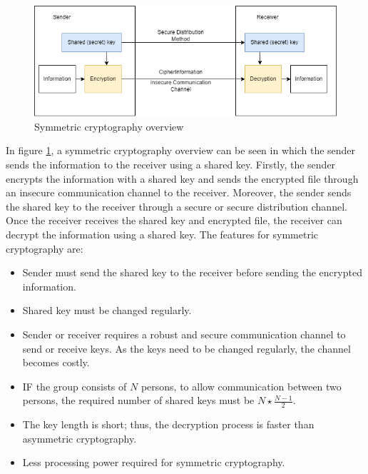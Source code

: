 \documentclass[12pt,a4paper]{article}
\begin{document}
\begin{figure}[H]
\centering
\includegraphics[scale=0.65]{symmetric_cryptography.PNG}
\caption{Symmetric cryptography overview \cite{r23}}
\label{symmetric_cryptography}
\end{figure}

In figure \ref{symmetric_cryptography}, a symmetric cryptography overview can be seen in which the sender sends the information to the receiver using a shared key. Firstly, the sender encrypts the information with a shared key and sends the encrypted file through an insecure communication channel to the receiver. Moreover, the sender sends the shared key to the receiver through a secure or secure distribution channel. Once the receiver receives the shared key and encrypted file, the receiver can decrypt the information using a shared key. The features for symmetric cryptography are: \cite{r23}

\begin{itemize}

\item Sender must send the shared key to the receiver before sending the encrypted information. \cite{r23}

\item Shared key must be changed regularly. \cite{r23}

\item Sender or receiver requires a robust and secure communication channel to send or receive keys. As the keys need to be changed regularly, the channel becomes costly. \cite{r23}

\item IF the group consists of $N$ persons, to allow communication between two persons, the required number of shared keys must be $N \star \frac{N-1}{2}$. \cite{r23}

\item The key length is short; thus, the decryption process is faster than asymmetric cryptography. \cite{r23}

\item Less processing power required for symmetric cryptography.\cite{r23}

\end{itemize}
\end{document}
